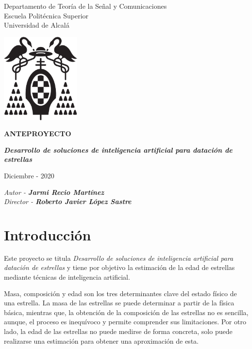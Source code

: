 \documentclass[12pt,oneside,a4paper]{article}
\begin{document}
\thispagestyle{empty}

\begin{center}


Departamento de Teoría de la Señal y Comunicaciones\\
Escuela Politécnica Superior\\
Universidad de Alcalá\\

\vspace{1cm}

\includegraphics[width=4cm]{figuras/logo-uah.eps}

\textbf{ANTEPROYECTO}

\vspace{1cm}

\begin{large}\textbf{\textit{Desarrollo de soluciones de inteligencia artificial para datación de estrellas}}\end{large}

\vfill

Diciembre - 2020

\end{center}

\begin{flushright}
\textit{Autor - \textbf{Jarmi Recio Martínez}} \\
\textit{Director - \textbf{Roberto Javier López Sastre}}
\end{flushright}

\newpage

\section{Introducción}
Este proyecto se titula \textit{Desarrollo de soluciones de inteligencia artificial para datación de estrellas} y tiene por objetivo la estimación de la edad de estrellas mediante técnicas de inteligencia artificial.

Masa, composición y edad son los tres determinantes clave del estado físico de una estrella.
La masa de las estrellas se puede determinar a partir de la física básica, mientras que, la obtención de la composición de las estrellas no es sencilla, aunque, el proceso es inequívoco y permite comprender sus limitaciones.
Por otro lado, la edad de las estrellas no puede medirse de forma concreta, solo puede realizarse una estimación para obtener una aproximación de esta.
\end{document}
